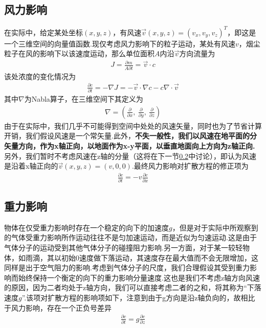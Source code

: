\documentclass{article}
\begin{document}
	\subsection{风力影响}
	在实际中，给定某处坐标$(x, y, z)$，有风速$\vec{v}(x,y,z)=(v_x, v_y, v_z)^T$，即这是一个三维空间的向量值函数.现仅考虑风力影响下的粒子运动，某处有风速$v$，烟尘粒子在风的影响下以该速度运动，那么单位面积$A$内沿$\vec{v}$方向流量为
	\begin{align*}
		J = \frac{\partial m}{A\partial t} = \vec{v}·c
	\end{align*}
	该处浓度的变化情况为
	\begin{align*}
		\frac{\partial c}{\partial t} = -\nabla J = -\vec{v}·\nabla c - c\nabla · \vec{v}
	\end{align*}
	其中$\nabla$为Nabla算子，在三维空间下其定义为
	\begin{align*}
		\nabla = (\frac{\partial}{\partial x}, ~\frac{\partial}{\partial y}, ~\frac{\partial}{\partial z})
	\end{align*}
	由于在实际中，我们几乎不可能得到空间中处处的风速矢量，同时也为了节省计算开销，我们假设风速是一个常矢量.此外，\textbf{不失一般性，我们以风速在地平面的分矢量方向，作为x轴正向，以地面作为x-y平面，以垂直地面向上方向为z轴正向.}另外，我们暂时不考虑风速在z轴的分量（这将在下一节\cref{sec1}中讨论），即认为风速是沿着x轴正向的$\vec{v}(x, y, z)=(v, 0, 0)$.最终风力影响对扩散方程的修正项为
	\begin{align*}
		\frac{\partial c}{\partial t} = -v\frac{\partial c}{\partial x}
	\end{align*}
	
	
	\subsection{重力影响}\label{sec1}
	物体在仅受重力影响时存在一个稳定的向下的加速度$g$，但是对于实际中所观察到的气体受重力影响所作运动往往不是匀加速运动，而是近似为匀速运动.这是由于气体分子的运动受到其他气体分子的碰撞阻力影响.另一方面，对于某一较轻物体，如雨滴，其以初始0速度做下落运动，其速度存在最大值而不会无限增加，这同样是出于空气阻力的影响.考虑到气体分子的尺度，我们合理假设其受到重力影响而始终保持一个衡定的向下的重力影响分量速度.这也是我们不考虑z轴方向风速的原因，因为二者均处于z轴方向，我们可以直接考虑二者的之和，将其称为“下落速度$g$”.该项对扩散方程的影响项如下，注意到由于g方向是沿z轴负向的，故相比于风力影响，存在一个正负号差异
	\begin{align*}
		\frac{\partial c}{\partial t} = g\frac{\partial c}{\partial z}
	\end{align*}
\end{document}
